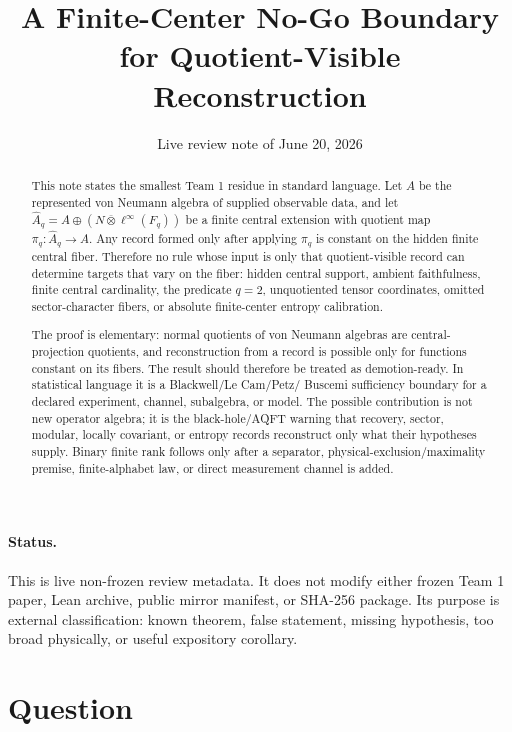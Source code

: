\documentclass[12pt]{article}
\title{A Finite-Center No-Go Boundary for Quotient-Visible Reconstruction}
\author{}
\date{Live review note of June 20, 2026}
\theoremstyle{definition}
\theoremstyle{remark}
\begin{document}
\maketitle

\begin{abstract}
This note states the smallest Team 1 residue in standard language.  Let \(A\)
be the represented von Neumann algebra of supplied observable data, and let
\(\widehat A_q=A\oplus (N\overline\otimes \ell^\infty(F_q))\) be a finite
central extension with quotient map \(\pi_q:\widehat A_q\to A\).  Any record
formed only after applying \(\pi_q\) is constant on the hidden finite central
fiber.  Therefore no rule whose input is only that quotient-visible record can
determine targets that vary on the fiber: hidden central support, ambient
faithfulness, finite central cardinality, the predicate \(q=2\), unquotiented
tensor coordinates, omitted sector-character fibers, or absolute finite-center
entropy calibration.

The proof is elementary: normal quotients of von Neumann algebras are
central-projection quotients, and reconstruction from a record is possible only
for functions constant on its fibers.  The result should therefore be treated
as demotion-ready.  In statistical language it is a Blackwell/Le Cam/Petz/
Buscemi sufficiency boundary for a declared experiment, channel, subalgebra, or
model.  The possible contribution is not new operator algebra; it is the
black-hole/AQFT warning that recovery, sector, modular, locally covariant, or
entropy records reconstruct only what their hypotheses supply.  Binary finite
rank follows only after a separator, physical-exclusion/maximality premise,
finite-alphabet law, or direct measurement channel is added.
\end{abstract}

\paragraph{Status.}
This is live non-frozen review metadata.  It does not modify either frozen Team
1 paper, Lean archive, public mirror manifest, or SHA-256 package.  Its purpose
is external classification: known theorem, false statement, missing hypothesis,
too broad physically, or useful expository corollary.

\section{Question}
\end{document}
